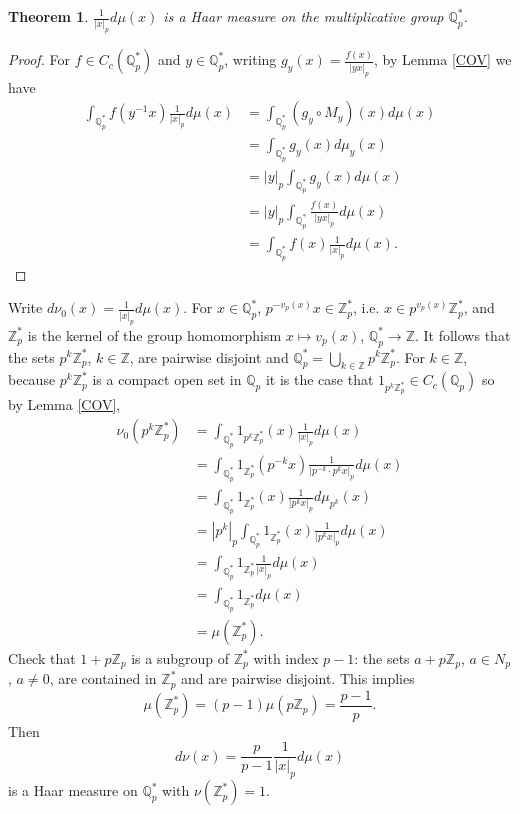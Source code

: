 \documentclass{article}
\newtheorem{theorem}{Theorem}
\theoremstyle{definition}
\begin{document}
\begin{theorem}
$\frac{1}{|x|_p} d\mu(x)$ is a Haar measure on the multiplicative group
$\mathbb{Q}_p^*$.
\end{theorem}
\begin{proof}
For $f \in C_c(\mathbb{Q}_p^*)$ and $y \in \mathbb{Q}_p^*$, 
writing $g_y(x) = \frac{f(x)}{|yx|_p}$, by
Lemma \ref{COV} we have
\begin{align*}
\int_{\mathbb{Q}_p^*} f(y^{-1}x) \frac{1}{|x|_p} d\mu(x) &= \int_{\mathbb{Q}_p^*} (g_y \circ M_y)(x)
d\mu(x)\\
&=\int_{\mathbb{Q}_p^*} g_y(x) d\mu_y(x)\\
&=|y|_p \int_{\mathbb{Q}_p^*}g_y(x)  d\mu(x)\\
&=|y|_p \int_{\mathbb{Q}_p^*}\frac{f(x)}{|yx|_p}d\mu(x)\\
&=\int_{\mathbb{Q}_p^*} f(x) \frac{1}{|x|_p} d\mu(x).
\end{align*}
\end{proof}

Write $d\nu_0(x) = \frac{1}{|x|_p} d\mu(x)$. 
For $x \in \mathbb{Q}_p^*$, $p^{-v_p(x)} x \in \mathbb{Z}_p^*$, i.e.
$x \in p^{v_p(x)} \mathbb{Z}_p^*$, and 
$\mathbb{Z}_p^*$ is the kernel of the group homomorphism
$x \mapsto v_p(x)$, $\mathbb{Q}_p^* \to \mathbb{Z}$. It follows that
the sets $p^k \mathbb{Z}_p^*$, $k \in \mathbb{Z}$, are pairwise disjoint and 
$\mathbb{Q}_p^* = \bigcup_{k \in \mathbb{Z}} p^k \mathbb{Z}_p^*$. 
For $k \in \mathbb{Z}$, because $p^k \mathbb{Z}_p^*$ is a compact open set in $\mathbb{Q}_p$ it is the case
that
$1_{p^k \mathbb{Z}_p^*} \in C_c(\mathbb{Q}_p)$ so
by Lemma \ref{COV},
\begin{align*}
\nu_0(p^k \mathbb{Z}_p^*) &=\int_{\mathbb{Q}_p^*} 1_{p^k \mathbb{Z}_p^*}(x)  \frac{1}{|x|_p} d\mu(x)\\
&=\int_{\mathbb{Q}_p^*} 1_{\mathbb{Z}_p^*} (p^{-k}x) \frac{1}{|p^{-k} \cdot p^k x|_p} d\mu(x)\\
&=\int_{\mathbb{Q}_p^*} 1_{\mathbb{Z}_p^*}(x) \frac{1}{|p^k x|_p} d\mu_{p^k}(x)\\
&=|p^k|_p \int_{\mathbb{Q}_p^*} 1_{\mathbb{Z}_p^*}(x) \frac{1}{|p^k x|_p} d\mu(x)\\
&=\int_{\mathbb{Q}_p^*} 1_{\mathbb{Z}_p^*} \frac{1}{|x|_p} d\mu(x)\\
&=\int_{\mathbb{Q}_p^*} 1_{\mathbb{Z}_p^*} d\mu(x)\\
&=\mu(\mathbb{Z}_p^*).
\end{align*}
Check that $1+p\mathbb{Z}_p$ is a subgroup of $\mathbb{Z}_p^*$ with index $p-1$:
the sets $a+p\mathbb{Z}_p$, $a \in N_p$, $a \neq 0$, are contained in
$\mathbb{Z}_p^*$ and are pairwise disjoint. 
This implies
\[
\mu(\mathbb{Z}_p^*) = (p-1) \mu(p\mathbb{Z}_p) = \frac{p-1}{p}.
\]
Then
\[
d\nu(x) = \frac{p}{p-1} \frac{1}{|x|_p} d\mu(x)
\]
is a Haar measure on $\mathbb{Q}_p^*$ with $\nu(\mathbb{Z}_p^*)=1$. 
\end{document}
